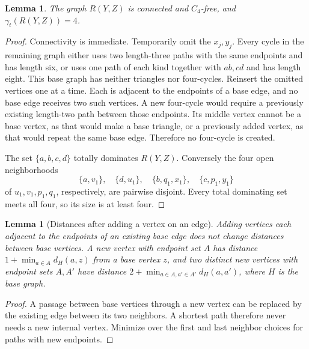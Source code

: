 \documentclass[11pt,a4paper]{article}
\newtheorem{lemma}[theorem]{Lemma}
\theoremstyle{definition}\newtheorem{definition}[theorem]{Definition}
\theoremstyle{remark}\newtheorem{remark}[theorem]{Remark}
\begin{document}
\begin{lemma}
\label{early:lem:269-c4td}
The graph $R(Y,Z)$ is connected and $C_4$-free, and
$\gamma_t(R(Y,Z))=4$.
\end{lemma}
\begin{proof}
Connectivity is immediate.  Temporarily omit the $x_j,y_j$.  Every
cycle in the remaining graph either uses two length-three paths
with the same endpoints and has length six, or uses one path of
each kind together with $ab,cd$ and has length eight.  This base
graph has neither triangles nor four-cycles.  Reinsert the omitted
vertices one at a time.  Each is adjacent to the endpoints of a
base edge, and no base edge receives two such vertices.  A new
four-cycle would require a previously existing length-two path
between those endpoints.  Its middle vertex cannot be a base
vertex, as that would make a base triangle, or a previously added
vertex, as that would repeat the same base edge.  Therefore no
four-cycle is created.

The set $\{a,b,c,d\}$ totally dominates $R(Y,Z)$.  Conversely the
four open neighborhoods
\[
 \{a,v_1\},\quad\{d,u_1\},\quad
 \{b,q_1,x_1\},\quad\{c,p_1,y_1\}
\]
of $u_1,v_1,p_1,q_1$, respectively, are pairwise disjoint.
Every total dominating set meets all four, so its size is at least four.
\end{proof}

\begin{lemma}[Distances after adding a vertex on an edge]
\label{early:lem:edge-triangle-distance}
Adding vertices each adjacent to the endpoints of an existing base
edge does not change distances between base vertices.  A new vertex
with endpoint set $A$ has distance $1+\min_{a\in A}d_H(a,z)$ from
a base vertex $z$, and two distinct new vertices with endpoint sets
$A,A'$ have distance
$2+\min_{a\in A,a'\in A'}d_H(a,a')$, where $H$ is the base graph.
\end{lemma}
\begin{proof}
A passage between base vertices through a new vertex can be replaced
by the existing edge between its two neighbors.  A shortest path
therefore never needs a new internal vertex.  Minimize over the first
and last neighbor choices for paths with new endpoints.
\end{proof}
\end{document}
